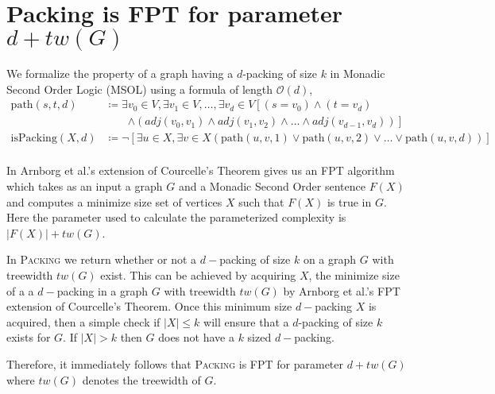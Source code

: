 \documentclass[10pt, a4paper]{article}
\theoremstyle{definition}
\newcommand{\mcO}{\mathcal{O}}
\begin{document}

\section{\sc Packing \textnormal{is FPT for parameter $d + tw(G)$}}

We formalize the property of a graph having a $d$-packing of size $k$ in Monadic Second Order Logic (MSOL) using a formula of length $\mcO(d)$,
\begin{align*}
	\mathrm{path}(s, t, d) 		&\coloneqq \exists v_0 \in V, \exists v_1 \in V, \dotsc, \exists v_d \in V
									\left [ (s=v_0) \wedge (t=v_d) \right.\nonumber \\
								&\qquad \left. \wedge (adj(v_0, v_1) \wedge adj(v_1, v_2) 
									\wedge \dots \wedge adj(v_{d-1}, v_d)) \right ] \\
	\mathrm{isPacking}(X, d)	&\coloneqq \neg \left [\exists u \in X, \exists v \in X (\mathrm{path}(u, v, 1) 
									\vee \mathrm{path}(u, v, 2) \vee \dots \vee \mathrm{path}(u, v, d) ) \right ] \\
\end{align*}

In Arnborg et al.'s extension of Courcelle's Theorem gives us an FPT algorithm which takes as an input a graph $G$ and a Monadic Second Order sentence $F(X)$ and computes a minimize size set of vertices $X$ such that $F(X)$ is true in $G$. Here the parameter used to calculate the parameterized complexity is $|F(X)| + tw(G)$. 

In \textsc{Packing} we return whether or not a $d-$packing of size $k$ on a graph $G$ with treewidth $tw(G)$ exist. This can be achieved by acquiring $X$, the minimize size of a a $d-$packing in a graph $G$ with treewidth $tw(G)$ by Arnborg et al.'s FPT extension of Courcelle's Theorem. Once this minimum size $d-$packing $X$ is acquired, then a simple check if $|X| \leq k$ will ensure that a $d$-packing of size $k$ exists for $G$. If $|X| > k$ then $G$ does not have a $k$ sized $d-$packing.



Therefore, it immediately follows that \textsc{Packing} is FPT for parameter $d+tw(G)$ where $tw(G)$ denotes the treewidth of $G$.




\end{document}
